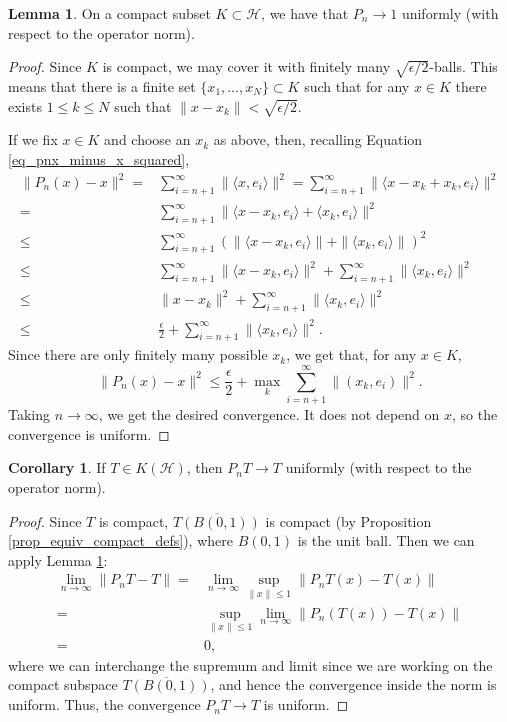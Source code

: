 \documentclass{dcthesis}
\numberwithin{equation}{section}
\numberwithin{equation}{section}
\theoremstyle{definition}
\newtheorem{lemma}[equation]{Lemma}
\newtheorem{corollary}[equation]{Corollary}
\begin{document}
\begin{lemma}
\label{lemma_pn_1_uniformly}
	On a compact subset $K\subset \mathcal{H}$, we have that $P_n\to 1$ uniformly (with respect to the operator norm).
\end{lemma}
\begin{proof}
Since $K$ is compact, we may cover it with finitely many $\sqrt{\epsilon /2}$-balls. This means that there is a finite set $\{x_1,\dots, x_N\}\subset K$ such that for any $x\in K$ there exists $1\leq k\leq N$ such that $\|x-x_k\|<\sqrt{\epsilon /2}$. 

	If we fix $x\in K$ and choose an $x_k$ as above, then, recalling Equation \ref{eq_pnx_minus_x_squared},
	\begin{align*}
		\|P_n(x)-x\|^2 =& \sum_{i=n+1}^\infty\|\langle x,e_i \rangle\|^2 = \sum_{i=n+1}^\infty \|\langle x-x_k+x_k,e_i \rangle\|^2 \\
		=& \sum_{i=n+1}^\infty\|\langle x-x_k,e_i \rangle + \langle x_k,e_i \rangle \|^2 \\
		\leq& \sum_{i=n+1}^\infty (\| \langle x-x_k,e_i \rangle \|+\| \langle x_k,e_i \rangle \|)^2 \\
		\leq& \sum_{i=n+1}^\infty \| \langle x-x_k,e_i \rangle \|^2 + \sum_{i=n+1}^\infty \| \langle x_k,e_i \rangle \|^2 \\
		\leq& \|x-x_k\|^2 + \sum_{i=n+1}^\infty \| \langle x_k,e_i \rangle \|^2 \\
		\leq& \frac{\epsilon}{2} + \sum_{i=n+1}^\infty \| \langle x_k,e_i \rangle \|^2.
	\end{align*}
	Since there are only finitely many possible $x_k$, we get that, for any $x\in K$,
	\[
		\|P_n(x)-x\|^2 \leq \frac{\epsilon}{2}+ \max_{k}\sum_{i=n+1}^\infty \|(x_k,e_i)\|^2.
	\]
	Taking $n\to\infty$, we get the desired convergence. It does not depend on $x$, so the convergence is uniform.
\end{proof}

\begin{corollary}
\label{cor_pnt_t}
If $T\in K(\mathcal{H})$, then $P_nT\to T$ uniformly (with respect to the operator norm).
\end{corollary}
\begin{proof}
	Since $T$ is compact, $\overline{T(B(0,1))}$ is compact (by Proposition \ref{prop_equiv_compact_defs}), where $B(0,1)$ is the unit ball. Then we can apply Lemma \ref{lemma_pn_1_uniformly}:
	\begin{align*}
		\lim_{n\to\infty}\|P_n T-T\| =& \lim_{n\to\infty}\sup_{\|x\|\leq 1} \|P_nT(x) - T(x)\| \\
		=& \sup_{\|x\|\leq 1}\lim_{n\to\infty}\|P_n(T(x))-T(x)\| \\
		=& 0,
	\end{align*}
	where we can interchange the supremum and limit since we are working on the compact subspace $\overline{T(B(0,1))}$, and hence the convergence inside the norm is uniform. Thus, the convergence $P_nT\to T$ is uniform.
\end{proof}
\end{document}
